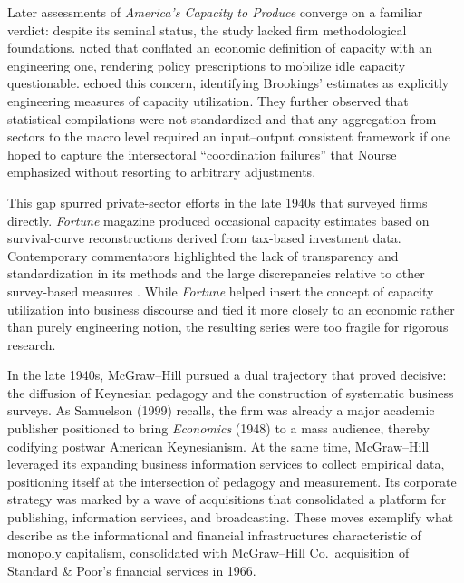 \documentclass[11pt]{article}
\begin{document}
Later assessments of \emph{America's Capacity to Produce} converge on a familiar verdict: despite its seminal status, the study lacked firm methodological foundations. \citet{burns1954} noted that \citet{nourseetal1934} conflated an economic definition of capacity with an engineering one, rendering policy prescriptions to mobilize idle capacity questionable. \citet{kleindavid1958} echoed this concern, identifying Brookings' estimates as explicitly engineering measures of capacity utilization. They further observed that statistical compilations were not standardized and that any aggregation from sectors to the macro level required an input--output consistent framework if one hoped to capture the intersectoral ``coordination failures'' that Nourse emphasized without resorting to arbitrary adjustments.

This gap spurred private-sector efforts in the late 1940s that surveyed firms directly. \emph{Fortune} magazine produced occasional capacity estimates based on survival-curve reconstructions derived from tax-based investment data. Contemporary commentators highlighted the lack of transparency and standardization in its methods and the large discrepancies relative to other survey-based measures \citep{butler1958,phillips1963}. While \emph{Fortune} helped insert the concept of capacity utilization into business discourse and tied it more closely to an economic rather than purely engineering notion, the resulting series were too fragile for rigorous research.

In the late 1940s, McGraw--Hill pursued a dual trajectory that proved decisive: the diffusion of Keynesian pedagogy and the construction of systematic business surveys. As Samuelson (1999) recalls, the firm was already a major academic publisher positioned to bring \emph{Economics} (1948) to a mass audience, thereby codifying postwar American Keynesianism. At the same time, McGraw--Hill leveraged its expanding business information services to collect empirical data, positioning itself at the intersection of pedagogy and measurement. Its corporate strategy was marked by a wave of acquisitions that consolidated a platform for publishing, information services, and broadcasting. These moves exemplify what \citet{baransweezy1988} describe as the informational and financial infrastructures characteristic of monopoly capitalism, consolidated with McGraw--Hill Co.\ acquisition of Standard \& Poor's financial services in 1966.
\end{document}
